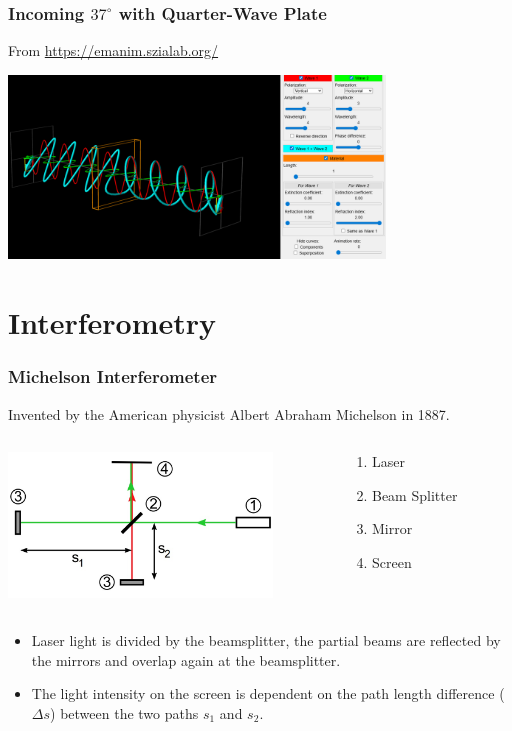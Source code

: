\documentclass{beamer}
\begin{document}
\begin{frame}\frametitle{Incoming $37^\circ$ with Quarter-Wave Plate}
From \url{https://emanim.szialab.org/}

\begin{center}
\includegraphics[width=10cm]{fig/waveplate_37_4.png}
\end{center}
\end{frame}

\section{Interferometry}

\begin{frame}\frametitle{Michelson Interferometer}

Invented by the American physicist Albert Abraham Michelson in 1887.

\begin{columns}
\begin{column}{7cm}
\begin{center}
\includegraphics[width=7cm]{fig/mint.jpg}
\end{center}
\end{column}
\begin{column}{3cm}
\begin{enumerate}
\item Laser
\item Beam Splitter
\item Mirror
\item Screen
\end{enumerate}
\end{column}
\end{columns}

\begin{itemize}
\item Laser light is divided by the beamsplitter, the partial beams are reflected by the mirrors and overlap again at the beamsplitter.
\item The light intensity on the screen is dependent on the path length difference ($\Delta s$) between the two paths $s_1$ and $s_2$. 
\end{itemize}
\end{frame}
\end{document}
